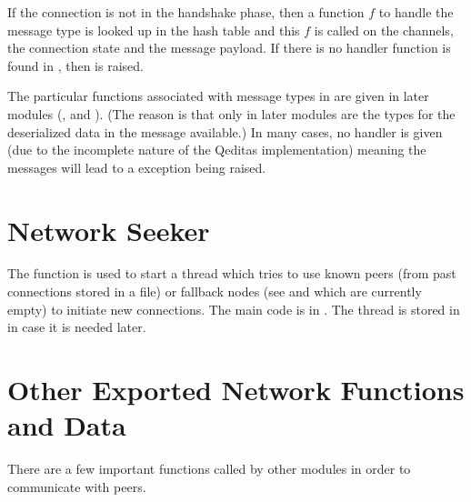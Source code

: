 If the connection is not in the handshake phase, then
a function $f$ to handle the message type is looked up in the hash table {}
and this $f$ is called on the channels, the connection state and the message payload.
If there is no handler function is found in {},
then {} is raised.

The particular functions associated with message types in {}
are given in later modules (,  and ). (The reason is that only in later modules are the types for
the deserialized data in the message available.)
In many cases, no handler is given (due to the incomplete nature of the Qeditas implementation)
meaning the messages will lead to a {} exception being raised.

\section{Network Seeker}

The function {} is used to start a thread
which tries to use known peers (from past connections stored in a {} file)
or fallback nodes (see {} and {}
which are currently empty) to initiate
new connections.
The main code is in {}.
The thread is stored in {}
in case it is needed later.

\section{Other Exported Network Functions and Data}

There are a few important functions called by other modules in order to
communicate with peers.

